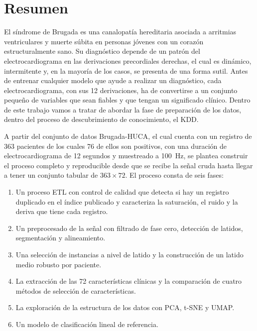 \section*{Resumen}

El síndrome de Brugada es una canalopatía hereditaria asociada a arritmias ventriculares y muerte súbita en personas jóvenes con un corazón estructuralmente sano. Su diagnóstico depende de un patrón del electrocardiograma en las derivaciones precordiales derechas, el cual es dinámico, intermitente y, en la mayoría de los casos, se presenta de una forma sutil. Antes de entrenar cualquier modelo que ayude a realizar un diagnóstico, cada electrocardiograma, con sus 12 derivaciones, ha de convertirse a un conjunto pequeño de variables que sean fiables y que tengan un significado clínico. Dentro de este trabajo vamos a tratar de abordar la fase de preparación de los datos, dentro del proceso de descubrimiento de conocimiento, el KDD.

A partir del conjunto de datos Brugada-HUCA, el cual cuenta con un registro de 363 pacientes de los cuales 76 de ellos son positivos, con una duración de electrocardiograma de 12 segundos y muestreado a \SI{100}{\hertz}, se plantea construir el proceso completo y reproducible desde que se recibe la señal cruda hasta llegar a tener un conjunto tabular de $363 \times 72$. El proceso consta de seis fases:

\begin{enumerate}
  \item Un proceso ETL con control de calidad que detecta si hay un registro duplicado en el índice publicado y caracteriza la saturación, el ruido y la deriva que tiene cada registro.
  \item Un preprocesado de la señal con filtrado de fase cero, detección de latidos, segmentación y alineamiento.
  \item Una selección de instancias a nivel de latido y la construcción de un latido medio robusto por paciente.
  \item La extracción de las 72 características clínicas y la comparación de cuatro métodos de selección de características.
  \item La exploración de la estructura de los datos con PCA, t-SNE y UMAP.
  \item Un modelo de clasificación lineal de referencia.
\end{enumerate}

